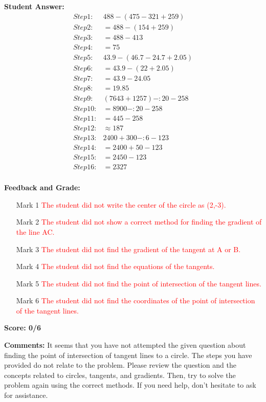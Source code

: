 \documentclass{article}
\begin{document}
\textbf{Student Answer:}
\begin{align*}
Step 1: & 488-(475-321+259) \\
Step 2: & =488-(154+259) \\
Step 3: & =488-413 \\
Step 4: & =75 \\
Step 5: & 43.9-(46.7-24.7+2.05) \\
Step 6: & =43.9-(22+2.05) \\
Step 7: & =43.9-24.05 \\
Step 8: & =19.85 \\
Step 9: & (7643+1257)-:20-258 \\
Step 10: & =8900-:20-258 \\
Step 11: & =445-258 \\
Step 12: & \approx 187 \\
Step 13: & 2400+300-:6-123 \\
Step 14: & =2400+50-123 \\
Step 15: & =2450-123 \\
Step 16: & =2327 \\
\end{align*}

\textbf{Feedback and Grade:}
\begin{itemize}
\item[Mark 1] \textcolor{red}{The student did not write the center of the circle as (2,-3).}
\item[Mark 2] \textcolor{red}{The student did not show a correct method for finding the gradient of the line AC.}
\item[Mark 3] \textcolor{red}{The student did not find the gradient of the tangent at A or B.}
\item[Mark 4] \textcolor{red}{The student did not find the equations of the tangents.}
\item[Mark 5] \textcolor{red}{The student did not find the point of intersection of the tangent lines.}
\item[Mark 6] \textcolor{red}{The student did not find the coordinates of the point of intersection of the tangent lines.}
\end{itemize}

\textbf{Score: 0/6}

\textbf{Comments:} It seems that you have not attempted the given question about finding the point of intersection of tangent lines to a circle. The steps you have provided do not relate to the problem. Please review the question and the concepts related to circles, tangents, and gradients. Then, try to solve the problem again using the correct methods. If you need help, don't hesitate to ask for assistance.
\end{document}
